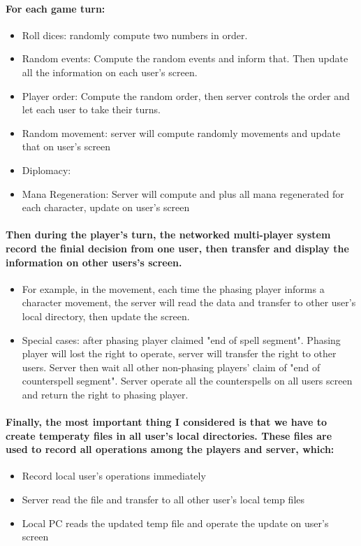 \documentclass[12pt,letterpaper]{scrreprt}
\begin{document}
\paragraph{For each game turn:}
\begin{itemize}
	\item Roll dices: randomly compute two numbers in order.
	\item Random events: Compute the random events and inform that. Then update all the information on each user's screen.
	\item Player order: Compute the random order, then server controls the order and let each user to take their turns.
	\item Random movement: server will compute randomly movements and update that on user's screen
	\item Diplomacy: 
	\item Mana Regeneration: Server will compute and plus all mana regenerated for each character, update on user's screen
\end{itemize}

\paragraph{Then during the player's turn, the networked multi-player system record the finial decision from one user, then transfer and display the information on other users's screen.}
\begin{itemize}
	\item For example, in the movement, each time the phasing player informs a character movement, the server will read the data and transfer to other user's local directory, then update the screen.
	\item Special cases: after phasing player claimed "end of spell segment". Phasing player will lost the right to operate, server will transfer the right to other users. Server then wait all other non-phasing players' claim of "end of counterspell segment". Server operate all the counterspells on all users screen and return the right to phasing player.
\end{itemize}

\paragraph{Finally, the most important thing I considered is that we have to create temperaty files in all user's local directories. These files are used to record all operations among the players and server, which:}
\begin{itemize}
	\item Record local user's operations immediately 
	\item Server read the file and transfer to all other user's local temp files
	\item Local PC reads the updated temp file and operate the update on user's screen
\end{itemize}
\end{document}
